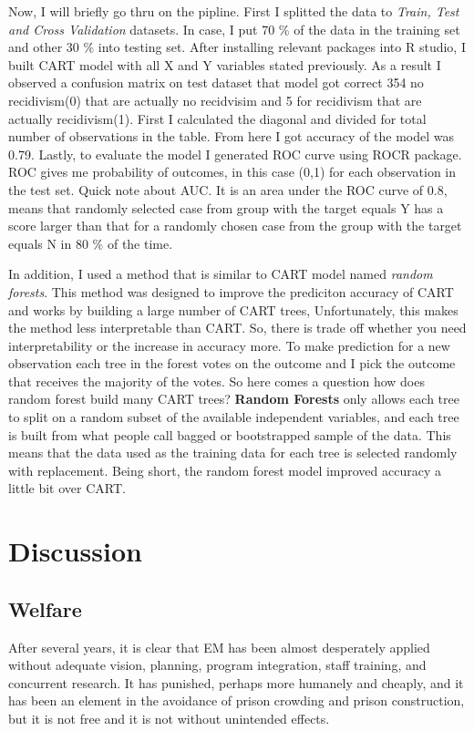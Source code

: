 \documentclass[a4paper,12pt]{article}
\begin{document}
Now, I will briefly go thru on the pipline. First I splitted the data to \textit{Train, Test and Cross Validation} datasets. In case, I put 70 \% of the data in the training set and other 30 \% into testing set. After installing relevant packages into R studio, I built CART model with all X and Y variables stated previously. As a result I observed a confusion matrix on test dataset that model got correct 354 no recidivism(0) that are actually no recidvisim and 5 for recidivism that are actually recidivism(1). First I calculated the diagonal and divided for total number of observations in the table. From here I got accuracy of the model was 0.79. Lastly, to evaluate the model I generated ROC curve using ROCR package. ROC gives me probability of outcomes, in this case (0,1) for each observation in the test set. Quick note about AUC. It is an area under the ROC curve of 0.8, means that randomly selected case from group with the target equals Y has a score larger than that for a randomly chosen case from the group with the target equals N in 80 \% of the time. 

In addition, I used a method that is similar to CART model named \textit{random forests}. This method was designed to improve the prediciton accuracy of CART and works by building a large number of CART trees, Unfortunately, this makes the method less interpretable than CART. So, there is trade off whether you need interpretability or the increase in accuracy more. To make prediction for a new observation each tree in the forest votes on the outcome and I pick the outcome that  receives the majority of the votes. So here comes a question how does random forest build many CART trees? \textbf{Random Forests} only allows each tree to split on a random subset of the available independent variables, and each tree is built from what people call bagged or bootstrapped sample of the data. This means that the data used as the training data for each tree is selected randomly with replacement. Being short, the random forest model improved accuracy a little bit over CART. 



\newpage
\section{Discussion}
\subsection{Welfare}
After several years, it is clear that EM has been almost desperately applied without adequate vision, planning, program integration, staff training, and concurrent research. It has punished, perhaps more humanely and cheaply, and it has been an element in the avoidance of prison crowding and prison construction, but it is not free and it is not without unintended effects. 
\end{document}
